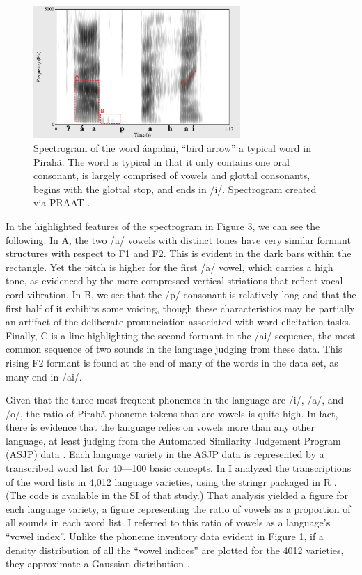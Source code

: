 \documentclass[output=paper,colorlinks,citecolor=brown
]{langscibook}
\begin{document}
\begin{figure}
\centering
\includegraphics[width=0.7\textwidth]{figures/everett_figure3.png}
\caption{\label{fig:Figure 3}Spectrogram of the word {\textglotstop}áapahai, “bird arrow” a typical word in Pirahã. The word is typical in that it only contains one oral consonant, is largely comprised of vowels and glottal consonants, begins with the glottal stop, and ends in /i/. Spectrogram created via PRAAT \citep{boersma2018praat}.}

\end{figure}

    In the highlighted features of the spectrogram in Figure 3, we can see the following: In A, the two /a/ vowels with distinct tones have very similar formant structures with respect to F1 and F2. This is evident in the dark bars within the rectangle. Yet the pitch is higher for the first /a/ vowel, which carries a high tone, as evidenced by the more compressed vertical striations that reflect vocal cord vibration. In B, we see that the /p/ consonant is relatively long and that the first half of it exhibits some voicing, though these characteristics may be partially an artifact of the deliberate pronunciation associated with word-elicitation tasks. Finally, C is a line highlighting the second formant in the /ai/ sequence, the most common sequence of two sounds in the language judging from these data. This rising F2 formant is found at the end of many of the words in the data set, as many end in /ai/.

    Given that the three most frequent phonemes in the language are /i/, /a/, and /o/, the ratio of Pirahã phoneme tokens that are vowels is quite high. In fact, there is evidence that the language relies on vowels more than any other language, at least judging from the Automated Similarity Judgement Program (ASJP) data \citep{wichmann2016asjp}. Each language variety in the ASJP data is represented by a transcribed word list for 40—100 basic concepts. In  I analyzed the transcriptions of the word lists in 4,012 language varieties, using the stringr packaged in R \citep{wickham2019package}. (The code is available in the SI of that study.) That analysis yielded a figure for each language variety, a figure representing the ratio of vowels as a proportion of all sounds in each word list. I referred to this ratio of vowels as a language’s “vowel index”. Unlike the phoneme inventory data evident in Figure 1, if a density distribution of all the “vowel indices” are plotted for the 4012 varieties, they approximate a Gaussian distribution \citep{everett2017languages}. 
\end{document}
